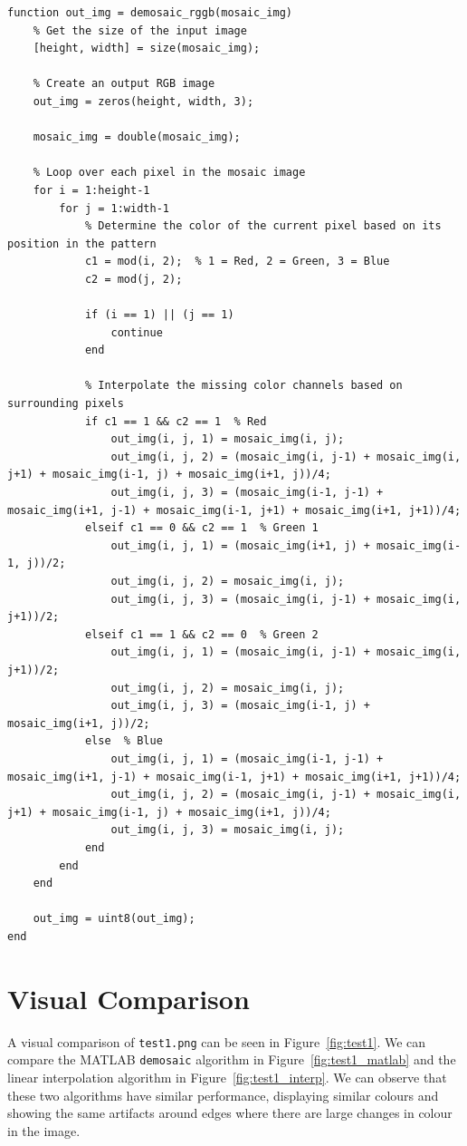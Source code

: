 \documentclass[12pt]{article}
\begin{document}
\begin{lstlisting}[style=Matlab-editor, caption={MATLAB Implementation of RGGB Interpolation Algorithm}, label={list:rggb}]
function out_img = demosaic_rggb(mosaic_img)
    % Get the size of the input image
    [height, width] = size(mosaic_img);
    
    % Create an output RGB image
    out_img = zeros(height, width, 3);

    mosaic_img = double(mosaic_img);
    
    % Loop over each pixel in the mosaic image
    for i = 1:height-1
        for j = 1:width-1
            % Determine the color of the current pixel based on its position in the pattern
            c1 = mod(i, 2);  % 1 = Red, 2 = Green, 3 = Blue
            c2 = mod(j, 2);

            if (i == 1) || (j == 1)
                continue
            end
            
            % Interpolate the missing color channels based on surrounding pixels
            if c1 == 1 && c2 == 1  % Red
                out_img(i, j, 1) = mosaic_img(i, j);
                out_img(i, j, 2) = (mosaic_img(i, j-1) + mosaic_img(i, j+1) + mosaic_img(i-1, j) + mosaic_img(i+1, j))/4;
                out_img(i, j, 3) = (mosaic_img(i-1, j-1) + mosaic_img(i+1, j-1) + mosaic_img(i-1, j+1) + mosaic_img(i+1, j+1))/4;
            elseif c1 == 0 && c2 == 1  % Green 1
                out_img(i, j, 1) = (mosaic_img(i+1, j) + mosaic_img(i-1, j))/2;
                out_img(i, j, 2) = mosaic_img(i, j);
                out_img(i, j, 3) = (mosaic_img(i, j-1) + mosaic_img(i, j+1))/2;
            elseif c1 == 1 && c2 == 0  % Green 2
                out_img(i, j, 1) = (mosaic_img(i, j-1) + mosaic_img(i, j+1))/2;
                out_img(i, j, 2) = mosaic_img(i, j);
                out_img(i, j, 3) = (mosaic_img(i-1, j) + mosaic_img(i+1, j))/2;
            else  % Blue
                out_img(i, j, 1) = (mosaic_img(i-1, j-1) + mosaic_img(i+1, j-1) + mosaic_img(i-1, j+1) + mosaic_img(i+1, j+1))/4;
                out_img(i, j, 2) = (mosaic_img(i, j-1) + mosaic_img(i, j+1) + mosaic_img(i-1, j) + mosaic_img(i+1, j))/4;
                out_img(i, j, 3) = mosaic_img(i, j);
            end
        end
    end

    out_img = uint8(out_img);
end
\end{lstlisting}

\section*{Visual Comparison}
A visual comparison of \texttt{test1.png} can be seen in Figure~\ref{fig:test1}. We can compare the MATLAB \texttt{demosaic} algorithm in Figure~\ref{fig:test1_matlab} and the linear interpolation algorithm in Figure~\ref{fig:test1_interp}. We can observe that these two algorithms have similar performance, displaying similar colours and showing the same artifacts around edges where there are large changes in colour in the image.
\end{document}
